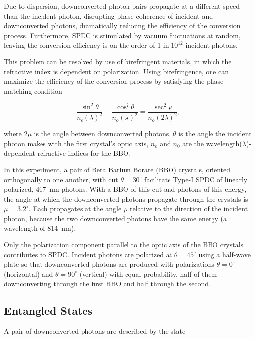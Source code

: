\documentclass{article}
\let\Oldsubsection\subsection
\renewcommand{\subsection}{\FloatBarrier\Oldsubsection}
\begin{document}
Due to dispersion, downconverted photon pairs propagate at a different speed than the incident photon, disrupting phase coherence of incident and downconverted photons, dramatically reducing the efficiency of the conversion process. Furthermore, SPDC is stimulated by vacuum fluctuations at random, leaving the conversion efficiency is on the order of 1 in $10^{12}$ incident photons.\cite{pors}

This problem can be resolved by use of birefringent materials, in which the refractive index is dependent on polarization. Using birefringence, one can maximize the efficiency of the conversion process by satisfying the phase matching condition

\begin{equation}
  \frac{\sin^2{\theta}}{n_e(\lambda)^2} + \frac{\cos^2{\theta}}{n_o(\lambda)^2} = \frac{\sec^2{\mu}}{n_o(2\lambda)^2}, \label{eq:phase}
\end{equation}

where $2 \mu$ is the angle between downconverted photons, $\theta$ is the angle the incident photon makes with the first crystal's optic axis, $n_e$ and $n_0$ are the wavelength($\lambda$)-dependent refractive indices for the BBO.

In this experiment, a pair of Beta Barium Borate (BBO) crystals, oriented orthogonally to one another, with cut $\theta=30^{\circ}$ facilitate Type-I SPDC of linearly polarized, 407~nm photons. With a BBO of this cut and photons of this energy, the angle at which the downconverted photons propagate through the crystals is $\mu = 3.2^{\circ}$. Each propagates at the angle $\mu$ relative to the direction of the incident photon, because the two downconverted photons have the same energy (a wavelength of 814~nm). 

Only the polarization component parallel to the optic axis of the BBO crystals contributes to SPDC. Incident photons are polarized at $\theta = 45^{\circ}$ using a half-wave plate so that downconverted photons are produced with polarizations $\theta = 0^{\circ}$ (horizontal) and $\theta = 90^{\circ}$ (vertical) with equal probability, half of them downconverting through the first BBO and half through the second.

\subsection{Entangled States}

A pair of downconverted photons are described by the state 
\end{document}

